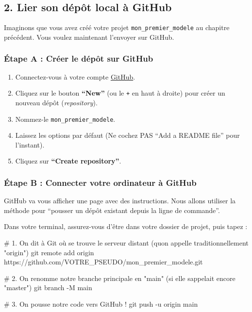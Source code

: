 \documentclass[
  letterpaper,
  DIV=11,
  numbers=noendperiod]{scrreprt}
\newenvironment{Shaded}{\begin{snugshade}}{\end{snugshade}}
\newcommand{\AttributeTok}[1]{\textcolor[rgb]{0.40,0.45,0.13}{#1}}
\newcommand{\CommentTok}[1]{\textcolor[rgb]{0.37,0.37,0.37}{#1}}
\newcommand{\FunctionTok}[1]{\textcolor[rgb]{0.28,0.35,0.67}{#1}}
\newcommand{\NormalTok}[1]{\textcolor[rgb]{0.00,0.23,0.31}{#1}}
\providecommand{\tightlist}{%
  \setlength{\itemsep}{0pt}\setlength{\parskip}{0pt}}
\begin{document}
\subsection{2. Lier son dépôt local à
GitHub}\label{lier-son-duxe9puxf4t-local-uxe0-github}

Imaginons que vous avez créé votre projet \texttt{mon\_premier\_modele}
au chapitre précédent. Vous voulez maintenant l'envoyer sur GitHub.

\subsubsection{Étape A : Créer le dépôt sur
GitHub}\label{uxe9tape-a-cruxe9er-le-duxe9puxf4t-sur-github}

\begin{enumerate}
\def\labelenumi{\arabic{enumi}.}
\tightlist
\item
  Connectez-vous à votre compte \href{https://github.com}{GitHub}.
\item
  Cliquez sur le bouton \textbf{``New''} (ou le \texttt{+} en haut à
  droite) pour créer un nouveau dépôt (\emph{repository}).
\item
  Nommez-le \texttt{mon\_premier\_modele}.
\item
  Laissez les options par défaut (Ne cochez PAS ``Add a README file''
  pour l'instant).
\item
  Cliquez sur \textbf{``Create repository''}.
\end{enumerate}

\subsubsection{Étape B : Connecter votre ordinateur à
GitHub}\label{uxe9tape-b-connecter-votre-ordinateur-uxe0-github}

GitHub va vous afficher une page avec des instructions. Nous allons
utiliser la méthode pour ``pousser un dépôt existant depuis la ligne de
commande''.

Dans votre terminal, assurez-vous d'être dans votre dossier de projet,
puis tapez :

\begin{Shaded}
\begin{Highlighting}[]
\CommentTok{\# 1. On dit à Git où se trouve le serveur distant (qu\textquotesingle{}on appelle traditionnellement "origin")}
\FunctionTok{git}\NormalTok{ remote add origin https://github.com/VOTRE\_PSEUDO/mon\_premier\_modele.git}

\CommentTok{\# 2. On renomme notre branche principale en "main" (si elle s\textquotesingle{}appelait encore "master")}
\FunctionTok{git}\NormalTok{ branch }\AttributeTok{{-}M}\NormalTok{ main}

\CommentTok{\# 3. On pousse notre code vers GitHub !}
\FunctionTok{git}\NormalTok{ push }\AttributeTok{{-}u}\NormalTok{ origin main}
\end{Highlighting}
\end{Shaded}
\end{document}
